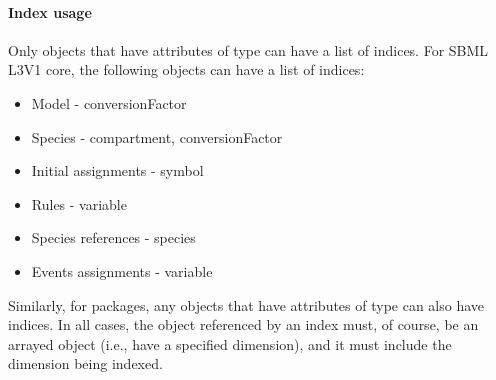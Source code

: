 \paragraph{Index usage}

Only objects that have attributes of  type can have a list of indices.  For SBML L3V1 core, the following objects can have a list of indices:
\begin{itemize}
\item Model - conversionFactor
\item Species - compartment, conversionFactor
\item Initial assignments - symbol
\item Rules - variable
\item Species references - species
\item Events assignments - variable
\end{itemize}
Similarly, for packages, any objects that have attributes of  type can also have indices.
In all cases, the object referenced by an index must, of course, be an arrayed object (i.e., have a specified dimension), and it must include the dimension being indexed.

